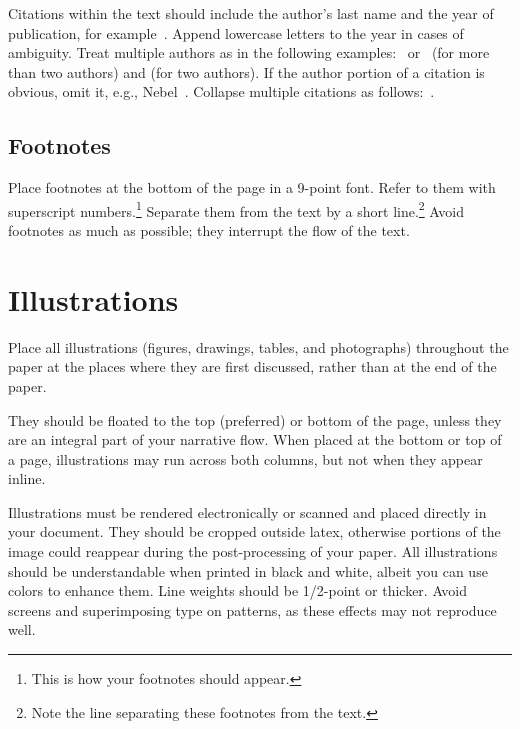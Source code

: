 \documentclass{article}
\begin{document}
Citations within the text should include the author's last name and
the year of publication, for example~\cite{gottlob:nonmon}.  Append
lowercase letters to the year in cases of ambiguity.  Treat multiple
authors as in the following examples:~\cite{abelson-et-al:scheme}
or~\cite{bgf:Lixto} (for more than two authors) and
\cite{brachman-schmolze:kl-one} (for two authors).  If the author
portion of a citation is obvious, omit it, e.g.,
Nebel~.  Collapse multiple citations as
follows:~\cite{gls:hypertrees,levesque:functional-foundations}.
\nocite{abelson-et-al:scheme}
\nocite{bgf:Lixto}
\nocite{brachman-schmolze:kl-one}
\nocite{gottlob:nonmon}
\nocite{gls:hypertrees}
\nocite{levesque:functional-foundations}
\nocite{levesque:belief}
\nocite{nebel:jair-2000}

\subsection{Footnotes}

Place footnotes at the bottom of the page in a 9-point font.  Refer to
them with superscript numbers.\footnote{This is how your footnotes
should appear.} Separate them from the text by a short
line.\footnote{Note the line separating these footnotes from the
text.} Avoid footnotes as much as possible; they interrupt the flow of
the text.

\section{Illustrations}

Place all illustrations (figures, drawings, tables, and photographs) throughout
the paper at the places where they are first discussed, rather than at the end
of the paper.

They should be floated to the top (preferred) or bottom of the page, unless
they are an integral part of your narrative flow. When placed at the bottom or
top of a page, illustrations may run across both columns, but not when they
appear inline.

Illustrations must be rendered electronically or scanned and placed directly in
your document. They should be cropped outside latex, otherwise portions of the
image could reappear during the post-processing of your paper. All
illustrations should be understandable when printed in black and white, albeit
you can use colors to enhance them. Line weights should be 1/2-point or
thicker. Avoid screens and superimposing type on patterns, as these effects may
not reproduce well.
\end{document}
